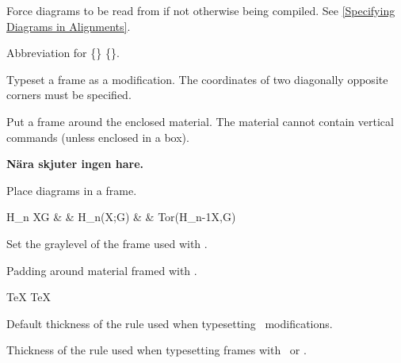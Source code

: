 Force diagrams to be read from  if not otherwise
being compiled. See \ref{Specifying Diagrams in Alignments}.
\endentry

\mod{}
Abbreviation for \csq\tr\{\dim\} \csq\hr\{\dim\}.
\endentry

Typeset a frame as a modification. The coordinates of two
diagonally opposite corners must be specified.
\endentry

Put a frame around the enclosed material.
The material cannot contain vertical commands (unless enclosed in a box).

{
\side
\frame\bf N\"ara skjuter ingen hare.\endframe
\endside
}
\endentry

Place diagrams in a frame.

\eg
\framed
\Long
H_n X\otimes G & \rMono & H_n(X;G) & \rEpi & {\rm Tor}(H_{n-1}X,G) \\
\endLong
\endeg
\endentry

Set the graylevel of the frame used with \csqq\frame\endframe.
\endentry

Padding around material framed with \csqq\frame\endframe.

\side
\frame \TeX \endframe
\framepad=10pt \frame \TeX \endframe
\endside
\endentry

Default thickness of the rule used when typesetting \csq\Frame\ modifications.
\endentry

Thickness of the rule used when typesetting frames with \csq\framed\ or
\csqq\frame\endframe.

